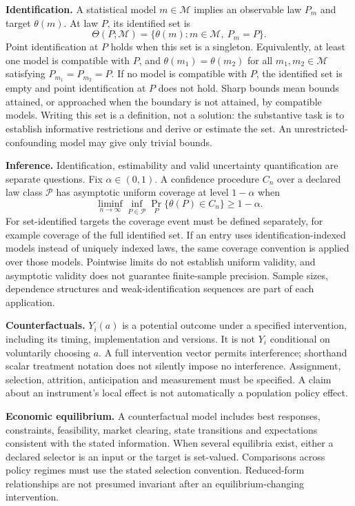 \documentclass[11pt,a4paper]{article}
\begin{document}
\textbf{Identification.} A statistical model $m\in\mathcal M$ implies an observable law $P_m$ and target $\theta(m)$. At law $P$, its identified set is
\[
\Theta(P;\mathcal M)=\{\theta(m):m\in\mathcal M,\ P_m=P\}.
\]
Point identification at $P$ holds when this set is a singleton. Equivalently, at least one model is compatible with $P$, and $\theta(m_1)=\theta(m_2)$ for all $m_1,m_2\in\mathcal M$ satisfying $P_{m_1}=P_{m_2}=P$. If no model is compatible with $P$, the identified set is empty and point identification at $P$ does not hold. Sharp bounds mean bounds attained, or approached when the boundary is not attained, by compatible models. Writing this set is a definition, not a solution: the substantive task is to establish informative restrictions and derive or estimate the set. An unrestricted-confounding model may give only trivial bounds.

\textbf{Inference.} Identification, estimability and valid uncertainty quantification are separate questions. Fix $\alpha\in(0,1)$. A confidence procedure $C_n$ over a declared law class $\mathcal P$ has asymptotic uniform coverage at level $1-\alpha$ when
\[
\liminf_{n\to\infty}\inf_{P\in\mathcal P}\Pr_P\{\theta(P)\in C_n\}\geq1-\alpha.
\]
For set-identified targets the coverage event must be defined separately, for example coverage of the full identified set. If an entry uses identification-indexed models instead of uniquely indexed laws, the same coverage convention is applied over those models. Pointwise limits do not establish uniform validity, and asymptotic validity does not guarantee finite-sample precision. Sample sizes, dependence structures and weak-identification sequences are part of each application.

\textbf{Counterfactuals.} $Y_i(a)$ is a potential outcome under a specified intervention, including its timing, implementation and versions. It is not $Y_i$ conditional on voluntarily choosing $a$. A full intervention vector permits interference; shorthand scalar treatment notation does not silently impose no interference. Assignment, selection, attrition, anticipation and measurement must be specified. A claim about an instrument's local effect is not automatically a population policy effect.

\textbf{Economic equilibrium.} A counterfactual model includes best responses, constraints, feasibility, market clearing, state transitions and expectations consistent with the stated information. When several equilibria exist, either a declared selector is an input or the target is set-valued. Comparisons across policy regimes must use the stated selection convention. Reduced-form relationships are not presumed invariant after an equilibrium-changing intervention.
\end{document}
